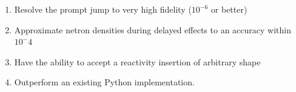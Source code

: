 \documentclass[review,onefignum,onetabnum]{siamart171218}
\DeclareMathOperator{\diag}{diag}
\begin{document}
\begin{enumerate}
  \item Resolve the prompt jump to very high fidelity ($10^{-6}$ or better)
  \item Approximate netron densities during delayed effects to an accuracy within $10^-4$
  \item Have the ability to accept a reactivity insertion of arbitrary shape
  \item Outperform an existing Python implementation.
\end{enumerate}







%
%
%
%
%
%
%
\end{document}
